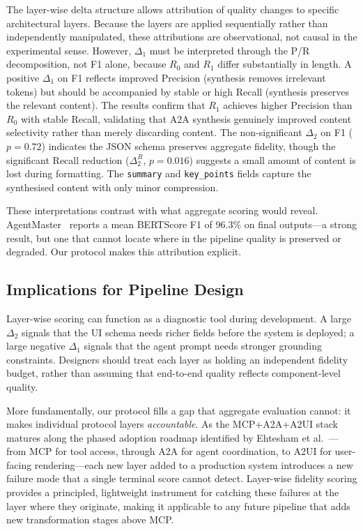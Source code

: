 \documentclass[10pt,journal,compsoc]{IEEEtran}
\begin{document}
The layer-wise delta structure allows attribution of quality changes to
specific architectural layers. Because the layers are applied sequentially
rather than independently manipulated, these attributions are observational, not
causal in the experimental sense. However, $\Delta_1$ must be interpreted through
the P/R decomposition, not F1 alone, because $R_0$ and $R_1$ differ substantially
in length. A positive $\Delta_1$ on F1 reflects improved Precision (synthesis
removes irrelevant tokens) but should be accompanied by stable or high Recall
(synthesis preserves the relevant content). The results confirm that $R_1$
achieves higher Precision than $R_0$ with stable Recall, validating that A2A
synthesis genuinely improved content selectivity rather than merely discarding
content. The non-significant $\Delta_2$ on F1 ($p=0.72$) indicates the JSON
schema preserves aggregate fidelity, though the significant Recall reduction
($\Delta_2^R$, $p=0.016$) suggests a small amount of content is lost during
formatting. The \texttt{summary} and \texttt{key\_points} fields capture the
synthesised content with only minor compression.

These interpretations contrast with what aggregate scoring would reveal.
AgentMaster~\cite{liao2025agentmaster} reports a mean BERTScore F1 of 96.3\% on
final outputs---a strong result, but one that cannot locate where in the pipeline
quality is preserved or degraded. Our protocol makes this attribution explicit.

\subsection{Implications for Pipeline Design}
\label{sec:implications}

Layer-wise scoring can function as a diagnostic tool during development. A large
$\Delta_2$ signals that the UI schema needs richer fields before the system is
deployed; a large negative $\Delta_1$ signals that the agent prompt needs stronger
grounding constraints. Designers should treat each layer as holding an independent
fidelity budget, rather than assuming that end-to-end quality reflects
component-level quality.

More fundamentally, our protocol fills a gap that aggregate evaluation cannot: it
makes individual protocol layers \emph{accountable}. As the MCP+A2A+A2UI stack
matures along the phased adoption roadmap identified by Ehtesham et
al.~\cite{ehtesham2025survey}---from MCP for tool access, through A2A for agent
coordination, to A2UI for user-facing rendering---each new layer added to a
production system introduces a new failure mode that a single terminal score
cannot detect. Layer-wise fidelity scoring provides a principled, lightweight
instrument for catching these failures at the layer where they originate, making
it applicable to any future pipeline that adds new transformation stages above MCP.
\end{document}
